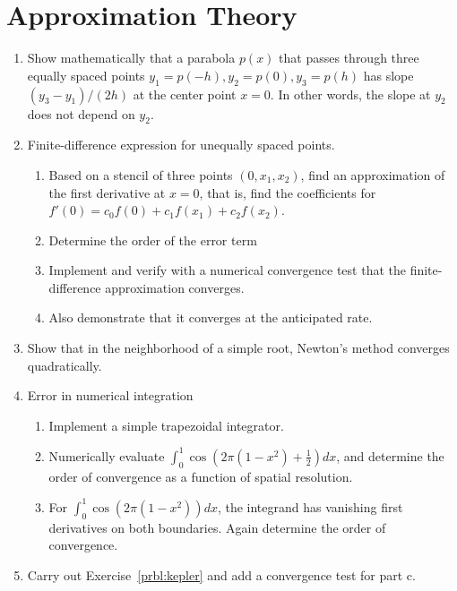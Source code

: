 \documentclass{article}
\begin{document}
\newpage
\section{Approximation Theory}
\begin{enumerate}
\item \label{prbl:cslope}
Show mathematically that a parabola $p(x)$ that passes through three equally spaced points $y_1=p(-h), y_2=p(0), y_3=p(h)$ has slope $(y_3-y_1)/(2h)$ at the center point $x=0$. In other words, the slope at $y_2$ does not depend on $y_2$.

\item Finite-difference expression for unequally spaced points. \vspace{-1em}
\begin{enumerate}\setlength{\itemsep}{0pt}
\item Based on a stencil of three points $(0,x_1,x_2)$, find an approximation of the first derivative at $x=0$, that is, find the coefficients for
  $f'(0) = c_0 f(0) + c_1 f(x_1) + c_2 f(x_2)$.
\item Determine the order of the error term
\item Implement and verify with a numerical convergence test that the finite-difference approximation converges.
\item Also demonstrate that it converges at the anticipated rate.
\end{enumerate}

\item
  Show that in the neighborhood of a simple root, Newton's method converges quadratically.
  
\item 
Error in numerical integration 
\vspace{-1em}
\begin{enumerate}\setlength{\itemsep}{0pt}
\item Implement a simple trapezoidal integrator. 
\item Numerically evaluate $\int_0^1 \cos(2\pi(1-x^2)+\frac{1}{2}) dx$, and determine the order of convergence as a function of spatial resolution.
\item For $\int_0^1 \cos(2\pi(1-x^2)) dx$, the integrand has vanishing first derivatives on both boundaries.  Again determine the order of convergence.
\end{enumerate}

\item
Carry out Exercise~\ref{prbl:kepler} and add a convergence test for part c.


\end{enumerate}
\end{document}
